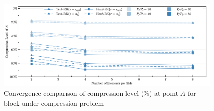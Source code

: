 \begin{figure}[H]
 \centering
\includegraphics[width=\textwidth]{block_convergence.png}
\caption{Convergence comparison of compression level (\%) at point $A$ for block under compression problem}\label{fg:block_convergence}
\end{figure}

